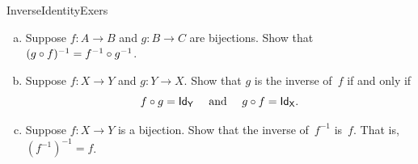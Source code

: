 \begin{exercise}{InverseIdentityExers}\ 
\begin{enumerate}[(a)]
\item \label{InverseIdentityExers-InvOfComp}
Suppose $f \colon A \to B$ and $g \colon B \to C$ are bijections. Show that $(g \circ f)^{-1} = f^{-1} \circ g^{-1}$.
\item \label{InverseIdentityExers-Comp=Id}
Suppose $f \colon X \to Y$ and $g \colon Y \to X$. Show that $g$ is the inverse of~$f$ if and only if
$$ \mbox{$f \circ g = \sf{Id}_Y$ \quad and \quad $g \circ f = \sf{Id}_X$} .$$
\item \label{InverseIdentityExers-InvOfInv}
Suppose $f \colon X \to Y$ is a bijection. Show that the inverse of~$f^{-1}$ is~$f$. That is, $(f^{-1})^{-1} = f$.
\end{enumerate}
\end{exercise}



%
